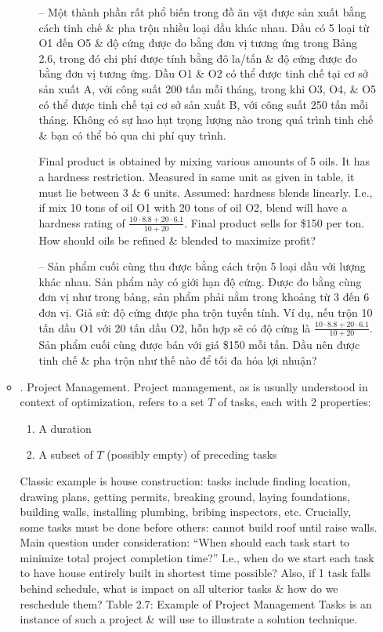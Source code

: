 \documentclass{article}
\begin{document}
\begin{itemize}
\begin{itemize}
\begin{itemize}
            -- Một thành phần rất phổ biến trong đồ ăn vặt được sản xuất bằng cách tinh chế \& pha trộn nhiều loại dầu khác nhau. Dầu có 5 loại từ O1 đến O5 \& độ cứng được đo bằng đơn vị tương ứng trong {\sf Bảng 2.6}, trong đó chi phí được tính bằng đô la/tấn \& độ cứng được đo bằng đơn vị tương ứng. Dầu O1 \& O2 có thể được tinh chế tại cơ sở sản xuất A, với công suất 200 tấn mỗi tháng, trong khi O3, O4, \& O5 có thể được tinh chế tại cơ sở sản xuất B, với công suất 250 tấn mỗi tháng. Không có sự hao hụt trọng lượng nào trong quá trình tinh chế \& bạn có thể bỏ qua chi phí quy trình.

            Final product is obtained by mixing various amounts of 5 oils. It has a hardness restriction. Measured in same unit as given in table, it must lie between 3 \& 6 units. Assumed: hardness blends linearly. I.e., if mix 10 tons of oil O1 with 20 tons of oil O2, blend will have a hardness rating of $\frac{10\cdot8.8 + 20\cdot6.1}{10 + 20}$. Final product sells for \$150 per ton. How should oils be refined \& blended to maximize profit?

            -- Sản phẩm cuối cùng thu được bằng cách trộn 5 loại dầu với lượng khác nhau. Sản phẩm này có giới hạn độ cứng. Được đo bằng cùng đơn vị như trong bảng, sản phẩm phải nằm trong khoảng từ 3 đến 6 đơn vị. Giả sử: độ cứng được pha trộn tuyến tính. Ví dụ, nếu trộn 10 tấn dầu O1 với 20 tấn dầu O2, hỗn hợp sẽ có độ cứng là $\frac{10\cdot8.8 + 20\cdot6.1}{10 + 20}$. Sản phẩm cuối cùng được bán với giá \$150 mỗi tấn. Dầu nên được tinh chế \& pha trộn như thế nào để tối đa hóa lợi nhuận?
        \end{itemize}
        \item {. Project Management.} Project management, as is usually understood in context of optimization, refers to a set $T$ of tasks, each with 2 properties:
        \begin{enumerate}
            \item A duration
            \item A subset of $T$ (possibly empty) of preceding tasks
        \end{enumerate}
        Classic example is house construction: tasks include finding location, drawing plans, getting permits, breaking ground, laying foundations, building walls, installing plumbing, bribing inspectors, etc. Crucially, some tasks must be done before others: cannot build roof until raise walls. Main question under consideration: ``When should each task start to minimize total project completion time?'' I.e., when do we start each task to have house entirely built in shortest time possible? Also, if 1 task falls behind schedule, what is impact on all ulterior tasks \& how do we reschedule them? {\sf Table 2.7: Example of Project Management Tasks} is an instance of such a project \& will use to illustrate a solution technique.


\end{itemize}
\end{itemize}
\end{document}
